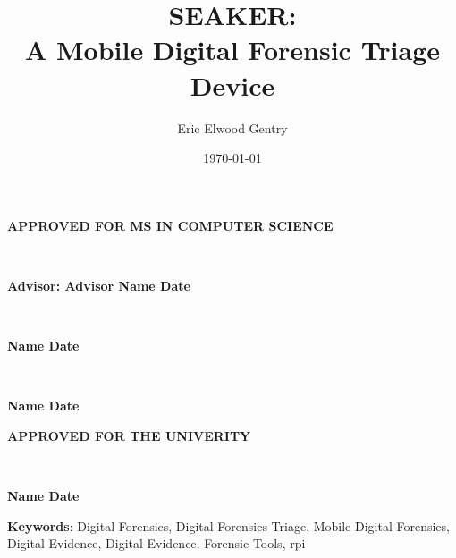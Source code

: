 \documentclass[12pt]{article}
\newcommand{\A}{\mathcal{A}}
\begin{document}
\begin{center}
{\large \bfseries APPROVED FOR MS IN COMPUTER SCIENCE \par}

\vspace{1.5 cm}

\hrulefill\\
{\large \bfseries Advisor: Advisor Name \hfill Date \par}

\vspace{1.5 cm}

\hrulefill\\
{\large \bfseries Name \hfill Date \par}

\vspace{1.5 cm}

\hrulefill\\
{\large \bfseries Name \hfill Date \par}

\vspace{3 cm}

{\large \bfseries APPROVED FOR THE UNIVERITY \par}

\vspace{1.5 cm}

\hrulefill\\
{\large \bfseries Name \hfill Date \par}
\end{center}

\newpage



\newpage

\title{SEAKER:\protect\\A Mobile Digital Forensic Triage Device} 
\author{Eric Elwood Gentry}

\date{\today}
\maketitle

\small{\textbf{Keywords}: Digital Forensics, Digital Forensics Triage, Mobile Digital Forensics,
Digital Evidence, Digital Evidence, Forensic Tools, \gls{rpi}}
\\
\end{document}
